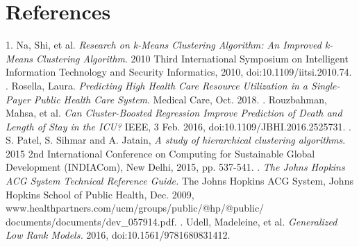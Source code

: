 \documentclass{article}
\begin{document}
\newpage 
\section{References}
1.	Na, Shi, et al. \textit{Research on k-Means Clustering Algorithm: An Improved k-Means Clustering Algorithm}. 2010 Third International Symposium on Intelligent Information Technology and Security Informatics, 2010, doi:10.1109/iitsi.2010.74. 
\newline
{}. Rosella, Laura. \textit{Predicting High Health Care Resource Utilization in a Single-Payer Public Health Care System}. Medical Care, Oct. 2018.
\newline
{}.	Rouzbahman, Mahsa, et al. \textit{Can Cluster-Boosted Regression Improve Prediction of Death and Length of Stay in the ICU?} IEEE, 3 Feb. 2016, doi:10.1109/JBHI.2016.2525731. 
\newline
{}.	S. Patel, S. Sihmar and A. Jatain, \textit{A study of hierarchical clustering algorithms}. 2015 2nd International Conference on Computing for Sustainable Global Development (INDIACom), New Delhi, 2015, pp. 537-541.
\newline
{}. \textit{The Johns Hopkins ACG System Technical Reference Guide.} The Johns Hopkins ACG System, Johns Hopkins School of Public Health, Dec. 2009, www.healthpartners.com/ucm/groups/public/@hp/@public/
\newline
documents/documents/dev\_057914.pdf. 
\newline
{}.	Udell, Madeleine, et al. \textit{Generalized Low Rank Models.} 2016, doi:10.1561/9781680831412.
\newline
\newline
\end{document}
